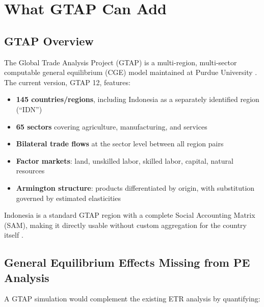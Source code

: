\documentclass[12pt,a4paper]{article}
\begin{document}
\section{What GTAP Can Add}
\label{sec:gtap_value}

\subsection{GTAP Overview}

The Global Trade Analysis Project (GTAP) is a multi-region, multi-sector computable general equilibrium (CGE) model maintained at Purdue University \cite{hertel1997}. The current version, GTAP 12, features:

\begin{itemize}
    \item \textbf{145 countries/regions}, including Indonesia as a separately identified region (``IDN'')
    \item \textbf{65 sectors} covering agriculture, manufacturing, and services
    \item \textbf{Bilateral trade flows} at the sector level between all region pairs
    \item \textbf{Factor markets}: land, unskilled labor, skilled labor, capital, natural resources
    \item \textbf{Armington structure}: products differentiated by origin, with substitution governed by estimated elasticities
\end{itemize}

Indonesia is a standard GTAP region with a complete Social Accounting Matrix (SAM), making it directly usable without custom aggregation for the country itself \cite{aguiar2022}.

\subsection{General Equilibrium Effects Missing from PE Analysis}

A GTAP simulation would complement the existing ETR analysis by quantifying:
\end{document}

